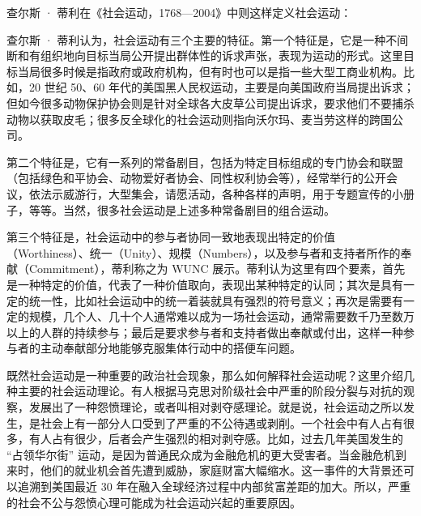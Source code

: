 查尔斯 · 蒂利在《社会运动，1768—2004》中则这样定义社会运动：


查尔斯 · 蒂利认为，社会运动有三个主要的特征。第一个特征是，它是一种不间断和有组织地向目标当局公开提出群体性的诉求声张，表现为运动的形式。这里目标当局很多时候是指政府或政府机构，但有时也可以是指一些大型工商业机构。比如，20 世纪 50、60 年代的美国黑人民权运动，主要是向美国政府当局提出诉求；但如今很多动物保护协会则是针对全球各大皮草公司提出诉求，要求他们不要捕杀动物以获取皮毛；很多反全球化的社会运动则指向沃尔玛、麦当劳这样的跨国公司。

第二个特征是，它有一系列的常备剧目，包括为特定目标组成的专门协会和联盟（包括绿色和平协会、动物爱好者协会、同性权利协会等），经常举行的公开会议，依法示威游行，大型集会，请愿活动，各种各样的声明，用于专题宣传的小册子，等等。当然，很多社会运动是上述多种常备剧目的组合运动。

第三个特征是，社会运动中的参与者协同一致地表现出特定的价值（Worthiness）、统一（Unity）、规模（Numbers），以及参与者和支持者所作的奉献（Commitment），蒂利称之为 WUNC 展示。蒂利认为这里有四个要素，首先是一种特定的价值，代表了一种价值取向，表现出某种特定的认同；其次是具有一定的统一性，比如社会运动中的统一着装就具有强烈的符号意义；再次是需要有一定的规模，几个人、几十个人通常难以成为一场社会运动，通常需要数千乃至数万以上的人群的持续参与；最后是要求参与者和支持者做出奉献或付出，这样一种参与者的主动奉献部分地能够克服集体行动中的搭便车问题。

既然社会运动是一种重要的政治社会现象，那么如何解释社会运动呢？这里介绍几种主要的社会运动理论。有人根据马克思对阶级社会中严重的阶段分裂与对抗的观察，发展出了一种怨愤理论，或者叫相对剥夺感理论。就是说，社会运动之所以发生，是社会上有一部分人口受到了严重的不公待遇或剥削。一个社会中有人占有很多，有人占有很少，后者会产生强烈的相对剥夺感。比如，过去几年美国发生的 “占领华尔街” 运动，是因为普通民众成为金融危机的更大受害者。当金融危机到来时，他们的就业机会首先遭到威胁，家庭财富大幅缩水。这一事件的大背景还可以追溯到美国最近 30 年在融入全球经济过程中内部贫富差距的加大。所以，严重的社会不公与怨愤心理可能成为社会运动兴起的重要原因。

